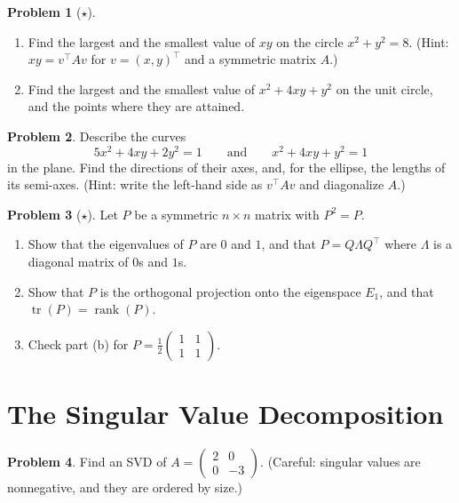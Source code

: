 \documentclass[11pt]{article}
\theoremstyle{definition}
\newtheorem{problem}{Problem}[section]
\DeclareMathOperator{\rank}{rank}
\DeclareMathOperator{\tr}{tr}
\begin{document}
\begin{problem}[$\star$]\label{pr:rayleigh}
    \begin{enumerate}[label=(\alph*)]
        \item Find the largest and the smallest value of $xy$ on the circle $x^2 + y^2 = 8$. (Hint: $xy = v^\top A v$ for $v = (x, y)^\top$ and a symmetric matrix $A$.)
        \item Find the largest and the smallest value of $x^2 + 4xy + y^2$ on the unit circle, and the points where they are attained.
    \end{enumerate}
\end{problem}

\begin{problem}\label{pr:quadric}
    Describe the curves
    \[5x^2 + 4xy + 2y^2 = 1 \qquad \text{and} \qquad x^2 + 4xy + y^2 = 1\]
    in the plane. Find the directions of their axes, and, for the ellipse, the lengths of its semi-axes. (Hint: write the left-hand side as $v^\top A v$ and diagonalize $A$.)
\end{problem}

\begin{problem}[$\star$]\label{pr:sym-idempotent}
    Let $P$ be a symmetric $n \times n$ matrix with $P^2 = P$.
    \begin{enumerate}[label=(\alph*)]
        \item Show that the eigenvalues of $P$ are $0$ and $1$, and that $P = Q \Lambda Q^\top$ where $\Lambda$ is a diagonal matrix of $0$s and $1$s.
        \item Show that $P$ is the orthogonal projection onto the eigenspace $E_1$, and that $\tr(P) = \rank(P)$.
        \item Check part (b) for $P = \frac{1}{2}\begin{pmatrix} 1 & 1 \\ 1 & 1 \end{pmatrix}$.
    \end{enumerate}
\end{problem}

\section{The Singular Value Decomposition}

\begin{problem}\label{pr:svd-diag}
    Find an SVD of $A = \begin{pmatrix} 2 & 0 \\ 0 & -3 \end{pmatrix}$. (Careful: singular values are nonnegative, and they are ordered by size.)
\end{problem}
\end{document}
